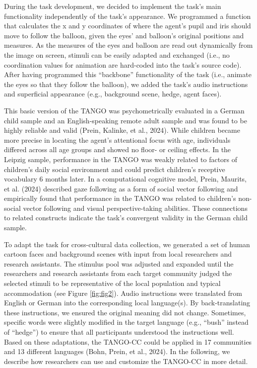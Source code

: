 \documentclass[
  man,floatsintext]{apa7}
\begin{document}
During the task development, we decided to implement the task's main functionality independently of the task's appearance.
We programmed a function that calculates the x and y coordinates of where the agent's pupil and iris should move to follow the balloon, given the eyes' and balloon's original positions and measures.
As the measures of the eyes and balloon are read out dynamically from the image on screen, stimuli can be easily adapted and exchanged (i.e., no coordination values for animation are hard-coded into the task's source code).
After having programmed this ``backbone'' functionality of the task (i.e., animate the eyes so that they follow the balloon), we added the task's audio instructions and superficial appearance (e.g., background scene, hedge, agent faces).

This basic version of the TANGO was psychometrically evaluated in a German child sample and an English-speaking remote adult sample and was found to be highly reliable and valid (Prein, Kalinke, et al., 2024).
While children became more precise in locating the agent's attentional focus with age, individuals differed across all age groups and showed no floor- or ceiling effects.
In the Leipzig sample, performance in the TANGO was weakly related to factors of children's daily social environment and could predict children's receptive vocabulary 6 months later.
In a computational cognitive model, Prein, Maurits, et al. (2024) described gaze following as a form of social vector following and empirically found that performance in the TANGO was related to children's non-social vector following and visual perspective-taking abilities.
These connections to related constructs indicate the task's convergent validity in the German child sample.

To adapt the task for cross-cultural data collection, we generated a set of human cartoon faces and background scenes with input from local researchers and research assistants.
The stimulus pool was adjusted and expanded until the researchers and research assistants from each target community judged the selected stimuli to be representative of the local population and typical accommodation (see Figure \ref{fig:fig2}).
Audio instructions were translated from English or German into the corresponding local language(s).
By back-translating these instructions, we ensured the original meaning did not change.
Sometimes, specific words were slightly modified in the target language (e.g., ``bush'' instead of ``hedge'') to ensure that all participants understood the instructions well.
Based on these adaptations, the TANGO-CC could be applied in 17 communities and 13 different languages (Bohn, Prein, et al., 2024). In the following, we describe how researchers can use and customize the TANGO-CC in more detail.
\end{document}
